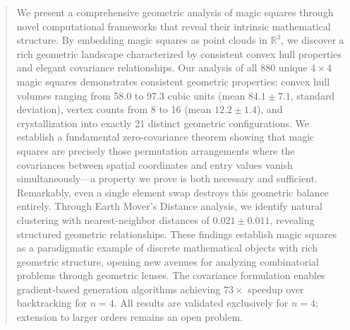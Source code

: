\begin{abstract}
We present a comprehensive geometric analysis of magic squares through novel computational frameworks that reveal their intrinsic mathematical structure. By embedding magic squares as point clouds in $\mathbb{R}^3$, we discover a rich geometric landscape characterized by consistent convex hull properties and elegant covariance relationships. Our analysis of all 880 unique $4 \times 4$ magic squares demonstrates consistent geometric properties: convex hull volumes ranging from 58.0 to 97.3 cubic units (mean $84.1 \pm 7.1$, standard deviation), vertex counts from 8 to 16 (mean $12.2 \pm 1.4$), and crystallization into exactly 21 distinct geometric configurations. We establish a fundamental zero-covariance theorem showing that magic squares are precisely those permutation arrangements where the covariances between spatial coordinates and entry values vanish simultaneously---a property we prove is both necessary and sufficient. Remarkably, even a single element swap destroys this geometric balance entirely. Through Earth Mover's Distance analysis, we identify natural clustering with nearest-neighbor distances of $0.021 \pm 0.011$, revealing structured geometric relationships. These findings establish magic squares as a paradigmatic example of discrete mathematical objects with rich geometric structure, opening new avenues for analyzing combinatorial problems through geometric lenses. The covariance formulation enables gradient-based generation algorithms achieving $73\times$ speedup over backtracking for $n=4$. All results are validated exclusively for $n=4$; extension to larger orders remains an open problem.
\end{abstract}
